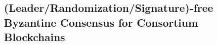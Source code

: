 
\subsection{(Leader/Randomization/Signature)-free Byzantine Consensus for Consortium Blockchains\cite{DBLP:journals/corr/CrainGLR17}}


